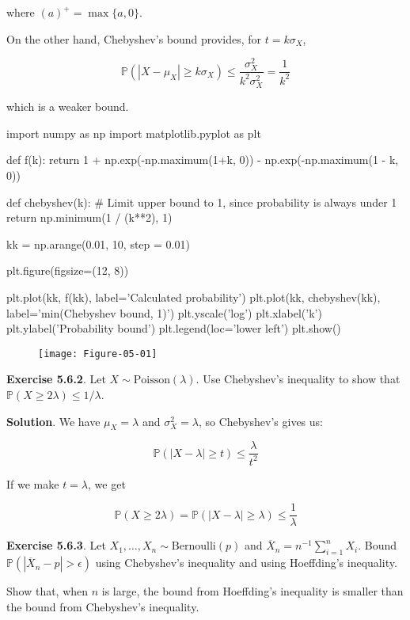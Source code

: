 where \((a)^+ = \max \{ a, 0 \}\).

On the other hand, Chebyshev's bound provides, for \(t = k\sigma_X\),

\[ \mathbb{P}(|X - \mu_X| \geq k \sigma_X) \leq \frac{\sigma_X^{2}}{k^{2} \sigma_X^{2}}  = \frac{1}{k^{2}} \]

which is a weaker bound.

\begin{python}
import numpy as np
import matplotlib.pyplot as plt

def f(k):
    return 1 + np.exp(-np.maximum(1+k, 0)) - np.exp(-np.maximum(1 - k, 0))

def chebyshev(k):
    # Limit upper bound to 1, since probability is always under 1
    return np.minimum(1 / (k**2), 1)

kk = np.arange(0.01, 10, step = 0.01)

plt.figure(figsize=(12, 8))

plt.plot(kk, f(kk), label='Calculated probability')
plt.plot(kk, chebyshev(kk), label='min(Chebyshev bound, 1)')
plt.yscale('log')
plt.xlabel('k')
plt.ylabel('Probability bound')
plt.legend(loc='lower left')
plt.show()
\end{python}

\begin{figure}[H]
\centering
\texttt{[image: Figure-05-01]}
\end{figure}

\textbf{Exercise 5.6.2}. Let \(X \sim \text{Poisson}(\lambda)\). Use
Chebyshev's inequality to show that
\(\mathbb{P}(X \geq 2\lambda) \leq 1 / \lambda\).

\textbf{Solution}. We have \(\mu_X = \lambda\) and
\(\sigma_X^{2} = \lambda\), so Chebyshev's gives us:

\[ \mathbb{P}(|X - \lambda| \geq t) \leq \frac{\lambda}{t^{2}} \]

If we make \(t = \lambda\), we get

\[ \mathbb{P}(X \geq 2\lambda) = \mathbb{P}(|X - \lambda| \geq \lambda) \leq \frac{1}{\lambda} \]

\textbf{Exercise 5.6.3}. Let
\(X_{1}, \dots, X_{n} \sim \text{Bernoulli}(p)\) and
\(\overline{X}_{n} = n^{-1} \sum_{i=1}^{n} X_{i}\). Bound
\(\mathbb{P}(|\overline{X}_{n} - p| > \epsilon)\) using Chebyshev's
inequality and using Hoeffding's inequality.

Show that, when \(n\) is large, the bound from Hoeffding's inequality is
smaller than the bound from Chebyshev's inequality.

